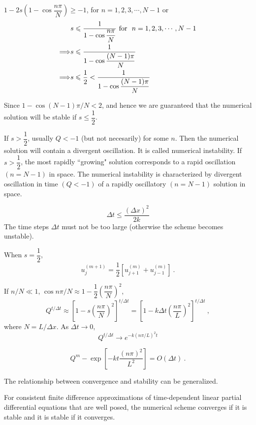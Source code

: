 \documentclass[12pt,a4paper]{article}
\begin{document}
$1-2s \left(1-\cos \dfrac{n\pi}{N}\right) \geqslant -1$, for $n = 1, 2, 3, \cdots, N-1$ or
\begin{align*}
& s \leqslant \frac{1}{1-\cos \dfrac{n\pi}{N} } ~{\rm for} ~~n = 1, 2, 3, \cdots, N-1 \\
\Longrightarrow & s \leqslant \frac{1}{1-\cos \dfrac{(N-1)\pi}{N} } \\
\Longrightarrow & s \leqslant \frac{1}{2} < \frac{1}{1-\cos \dfrac{(N-1)\pi}{N} }
\end{align*}

Since $1-\cos(N-1)\pi/N<2$, and hence we are guaranteed that the numerical solution will be stable if $s\leqslant \dfrac{1}{2}$.

If $s> \dfrac{1}{2}$, usually $Q<-1$ (but not necesarily) for some $n$. Then the numerical solution will contain a divergent oscillation. It is called numerical instability. If $s>\dfrac{1}{2}$, the most rapidly ``growing" solution corresponds to a rapid oscillation $(n=N-1)$ in space. The numerical instability is characterized by divergent oscillation in time $(Q<-1)$ of a rapidly oscillatory $(n=N-1)$ solution in space. 

\begin{equation}
\Delta t \leqslant \frac{(\Delta x)^2}{2k}
\end{equation}
The time steps $\Delta t$ must not be too large (otherwise the scheme becomes unstable).

When $s = \dfrac{1}{2}$,
\begin{equation*}
u_j^{(m+1)} = \dfrac{1}{2} \left[u_{j+1}^{(m)} +u_{j-1}^{(m)} \right] ~.
\end{equation*}


If $n/N \ll 1$, $\cos n\pi/N \approx 1 -\dfrac{1}{2}\left(\dfrac{n\pi}{N} \right)^2$, 
\begin{equation*}
Q^{t/\Delta t} \approx \left[1-s \left(\dfrac{n\pi}{N} \right)^2 \right]^{t/\Delta t} = \left[1-k\Delta t \left(\dfrac{n\pi}{L} \right)^2 \right]^{t/\Delta t} ~,
\end{equation*}
where $N = L/\Delta x$. As $\Delta t \rightarrow 0$, 
\begin{equation*}
Q^{t/\Delta t}  \rightarrow e^{-k(n\pi/L)^2 t}
\end{equation*}

\begin{equation*}
Q^m - \exp \left[-kt\frac{(n\pi)^2}{L^2} \right] = O(\Delta t) ~.
\end{equation*}

The relationship between convergence and stability can be generalized.
\begin{tcolorbox}[colback=green!15,colframe=green!40!black,title= Lax equivalency Theorem]
For consistent finite difference approximations of time-dependent linear partial differential equations that are well posed, the numerical scheme converges if it is stable and it is stable if it converges.
\end{tcolorbox}
\end{document}

